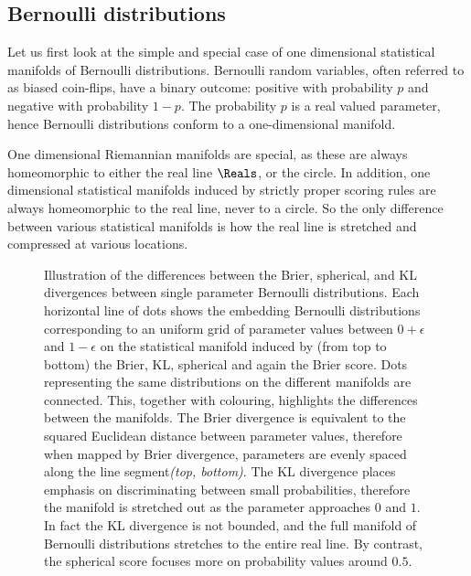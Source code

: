 \subsection{Bernoulli distributions}

Let us first look at the simple and special case of one dimensional statistical manifolds of Bernoulli distributions. Bernoulli random variables, often referred to as biased coin-flips, have a binary outcome: positive with probability $p$ and negative with probability $1-p$. The probability $p$ is a real valued parameter, hence Bernoulli distributions conform to a one-dimensional manifold.

One dimensional Riemannian manifolds are special, as these are always homeomorphic to either the real line $\Reals$, or the circle. In addition, one dimensional statistical manifolds induced by strictly proper scoring rules are always homeomorphic to the real line, never to a circle. So the only difference between various statistical manifolds is how the real line is stretched and compressed at various locations.

\begin{figure} %
	\begin{center}
	\end{center}
	\caption[Brier, spherical and logarithmic scoring of Bernoulli distributions]{Illustration of the differences between the Brier, spherical, and KL divergences between single parameter Bernoulli distributions. Each horizontal line of dots shows the embedding Bernoulli distributions corresponding to an uniform grid of parameter values between $0+\epsilon$ and $1-\epsilon$ on the statistical manifold induced by (from top to bottom) the Brier, KL, spherical and again the Brier score.  Dots representing the same distributions on the different manifolds are connected. This, together with colouring, highlights the differences between the manifolds.
	The Brier divergence is equivalent to the squared Euclidean distance between parameter values, therefore when mapped by Brier divergence, parameters are evenly spaced along the line segment\emph{(top, bottom)}. The KL divergence places emphasis on discriminating between  small probabilities, therefore the manifold is stretched out as the parameter approaches $0$ and $1$. In fact the KL divergence is not bounded, and the full manifold of Bernoulli distributions stretches to the entire real line. By contrast, the spherical score focuses more on probability values around $0.5$.\label{fig:Bernoulli_comparison}}
\end{figure}

